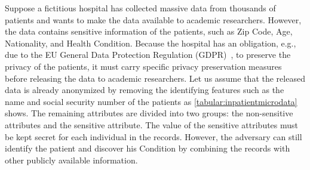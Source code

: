Suppose a fictitious hospital has collected massive data from thousands of patients and wants to make the data available to academic researchers. However, the data contains sensitive information of the patients, such as Zip Code, Age, Nationality, and Health Condition. Because the hospital has an obligation, e.g., due to the EU General Data Protection Regulation (GDPR)~\cite{voigt2017eu}, to preserve the privacy of the patients, it must carry specific privacy preservation measures before releasing the data to academic researchers.
Let us assume that the released data is already anonymized by removing the identifying features such as the name and social security number of the patients as \autoref{tabular:inpatientmicrodata} shows. The remaining attributes are divided into two groups: the non-sensitive attributes and the sensitive attribute. The value of the sensitive attributes must be kept secret for each individual in the records. However, the adversary can still identify the patient and discover his Condition by combining the records with other publicly available information.

